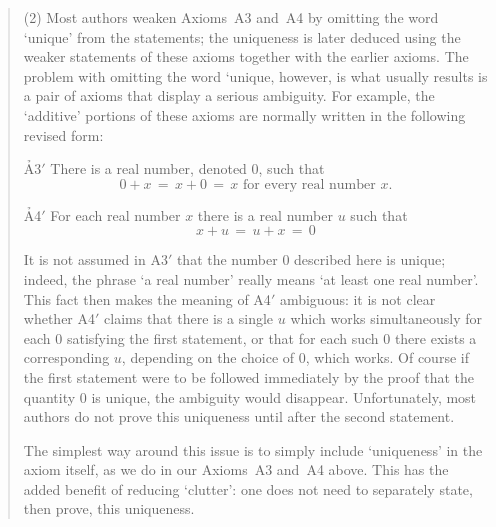 \begin{quotation}
{\V

        (2) Most authors weaken Axioms~A3 and~A4 by omitting the word `unique' from the statements;
    the uniqueness is later deduced using the weaker statements of these axioms together with the earlier axioms.
    The problem with omitting the word `unique, however, is what usually results is a pair of axioms that display a serious ambiguity.
    For example, the `additive' portions of these axioms are normally written in the following revised form:

        \h A3$'$ There is a real number, denoted $0$, such that
        \begin{displaymath}
        0+x \,=\, x+0 \,=\, x \mbox{ for every real number~$x$}.
        \end{displaymath}


        \h A4$'$ For each real number $x$ there is a real number $u$ such that         
        \begin{displaymath}
        x + u \,=\, u + x \,=\, 0
        \end{displaymath}

\noindent It is not assumed in A3$'$ that the number $0$ described here is unique;
    indeed, the phrase `a real number' really means `at least one real number'. This fact then makes the meaning of A4$'$ ambiguous:
    it is not clear whether A4$'$ claims that there is a single $u$ which works simultaneously for each $0$ satisfying the first statement,
    or that for each such $0$ there exists a corresponding $u$, depending on the choice of $0$, which works.
    Of course if the first statement were to be followed immediately by the proof that the quantity $0$ is unique, the ambiguity would disappear.
    Unfortunately, most authors do not prove this uniqueness until after the second statement.
    
        The simplest way around this issue is to simply include `uniqueness' in the axiom itself, as we do in our Axioms~A3 and~A4 above.
    This has the added benefit of reducing `clutter': one does not need to separately state, then prove, this uniqueness.

\V

}
\end{quotation}
